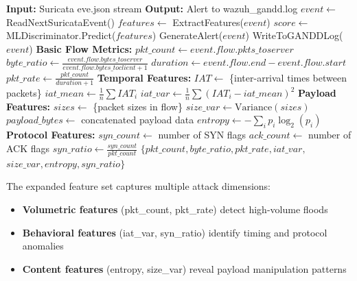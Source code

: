\begin{algorithm}
\caption{GANDD-Bridge Detection Algorithm}
\label{alg:bridge}
\begin{algorithmic}[1]
\State \textbf{Input:} Suricata eve.json stream
\State \textbf{Output:} Alert to wazuh\_gandd.log
\State
{}
        \State $event \gets$ ReadNextSuricataEvent()
            \State $features \gets$ ExtractFeatures($event$)
            \State $score \gets$ MLDiscriminator.Predict($features$)
                \State GenerateAlert($event$)
                \State WriteToGANDDLog($event$)
            \EndIf
        \EndIf
    \EndWhile
\EndFunction
\State
{}
    \State \textbf{Basic Flow Metrics:}
    \State $pkt\_count \gets event.flow.pkts\_toserver$
    \State $byte\_ratio \gets \frac{event.flow.bytes\_toserver}{event.flow.bytes\_toclient+1}$
    \State $duration \gets event.flow.end - event.flow.start$
    \State $pkt\_rate \gets \frac{pkt\_count}{duration+1}$
    \State
    \State \textbf{Temporal Features:}
    \State $IAT \gets$ \{inter-arrival times between packets\}
    \State $iat\_mean \gets \frac{1}{n}\sum IAT_i$
    \State $iat\_var \gets \frac{1}{n}\sum (IAT_i - iat\_mean)^2$
    \State
    \State \textbf{Payload Features:}
    \State $sizes \gets$ \{packet sizes in flow\}
    \State $size\_var \gets \text{Variance}(sizes)$
    \State $payload\_bytes \gets$ concatenated payload data
    \State $entropy \gets -\sum_{i} p_i \log_2(p_i)$ 
    \State
    \State \textbf{Protocol Features:}
    \State $syn\_count \gets$ number of SYN flags
    \State $ack\_count \gets$ number of ACK flags
    \State $syn\_ratio \gets \frac{syn\_count}{pkt\_count}$
    \State
    \State \Return $\{pkt\_count, byte\_ratio, pkt\_rate, iat\_var, $
    \State \hspace{2em} $size\_var, entropy, syn\_ratio\}$
\EndFunction
\end{algorithmic}
\end{algorithm}

The expanded feature set captures multiple attack dimensions:

\begin{itemize}
    \item \textbf{Volumetric features} (pkt\_count, pkt\_rate) detect high-volume floods
    \item \textbf{Behavioral features} (iat\_var, syn\_ratio) identify timing and protocol anomalies
    \item \textbf{Content features} (entropy, size\_var) reveal payload manipulation patterns
\end{itemize}

